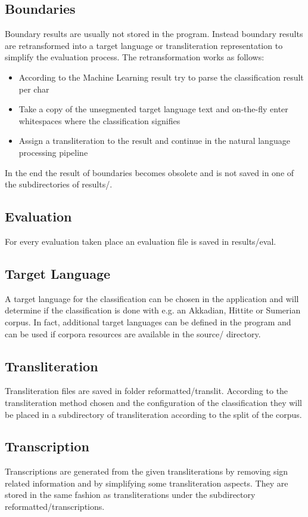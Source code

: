 \documentclass[10pt,a4paper,titlepage]{report}
\begin{document}
	\subsection{Boundaries}
	Boundary results are usually not stored in the program. Instead boundary results are retransformed into a target language or transliteration representation to simplify the evaluation process. The retransformation works as follows:
	\begin{itemize}
		\item According to the Machine Learning result try to parse the classification result per char
		\item Take a copy of the unsegmented target language text and on-the-fly enter whitespaces where the classification signifies
		\item Assign a transliteration to the result and continue in the natural language processing pipeline
	\end{itemize}
	In the end the result of boundaries becomes obsolete and is not saved in one of the subdirectories of results/.
	\subsection{Evaluation}
	For every evaluation taken place an evaluation file is saved in results/eval.
	\subsection{Target Language}
	A target language for the classification can be chosen in the application and will determine if the classification is done with e.g. an Akkadian, Hittite or Sumerian corpus. In fact, additional target languages can be defined in the program and can be used if corpora resources are available in the source/ directory.
	\subsection{Transliteration}
	Transliteration files are saved in folder reformatted/translit. According to the transliteration method chosen and the configuration of the classification they will be placed in a subdirectory of transliteration according to the split of the corpus.
	\subsection{Transcription}
Transcriptions are generated from the given transliterations by removing sign related information and by simplifying some transliteration aspects. They are stored in the same fashion as transliterations under the subdirectory reformatted/transcriptions.
\end{document}
